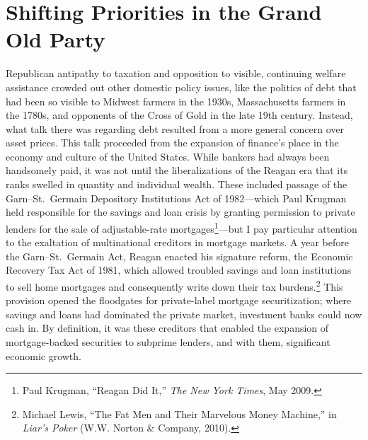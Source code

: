 \documentclass[12pt,oneside]{psthesis}
\begin{document}
\hypertarget{shifting-priorities-in-the-grand-old-party}{%
\section{Shifting Priorities in the Grand Old Party}\label{shifting-priorities-in-the-grand-old-party}}

Republican antipathy to taxation and opposition to visible, continuing welfare assistance crowded out other domestic policy issues, like the politics of debt that had been so visible to Midwest farmers in the 1930s, Massachusetts farmers in the 1780s, and opponents of the Cross of Gold in the late 19th century.
Instead, what talk there was regarding debt resulted from a more general concern over asset prices.
This talk proceeded from the expansion of finance's place in the economy and culture of the United States.
While bankers had always been handsomely paid, it was not until the liberalizations of the Reagan era that its ranks swelled in quantity and individual wealth.
These included passage of the Garn--St.~Germain Depository Institutions Act of 1982---which Paul Krugman held responsible for the savings and loan crisis by granting permission to private lenders for the sale of adjustable-rate mortgages\footnote{Paul Krugman, ``Reagan Did It,'' \emph{The New York Times}, May 2009.}---but I pay particular attention to the exaltation of multinational creditors in mortgage markets.
A year before the Garn--St.~Germain Act, Reagan enacted his signature reform, the Economic Recovery Tax Act of 1981, which allowed troubled savings and loan institutions to sell home mortgages and consequently write down their tax burdens.\footnote{Michael Lewis, ``The Fat Men and Their Marvelous Money Machine,'' in \emph{Liar's Poker} (W.W. Norton \& Company, 2010).}
This provision opened the floodgates for private-label mortgage securitization; where savings and loans had dominated the private market, investment banks could now cash in.
By definition, it was these creditors that enabled the expansion of mortgage-backed securities to subprime lenders, and with them, significant economic growth.
\end{document}
